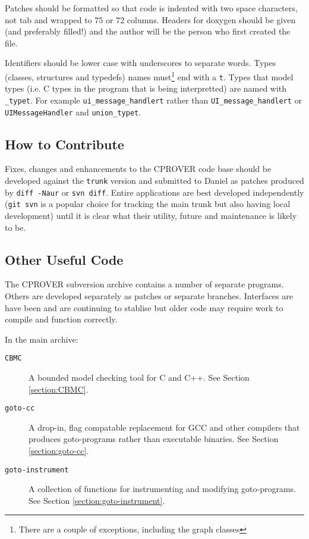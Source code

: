 \documentclass{article}
\newcommand{\code}[1]{\texttt{#1}}
\newcommand{\prog}[1]{\texttt{#1}}
\begin{document}
Patches should be formatted so that code is indented with two space
characters, not tab and wrapped to 75 or 72 columns.  Headers for
doxygen should be given (and preferably filled!) and the author will
be the person who first created the file.

Identifiers should be lower case with underscores to separate words.
Types (classes, structures and typedefs) names must\footnote{There are
a couple of exceptions, including the graph classes} end with a
\code{t}.  Types that model types (i.e. C types in the program that is
being interpretted) are named with \code{\_typet}.
For example \code{ui\_message\_handlert} rather than
\code{UI\_message\_handlert} or \code{UIMessageHandler} and
\code{union\_typet}.



\subsection{How to Contribute}

Fixes, changes and enhancements to the CPROVER code base should be
developed against the \texttt{trunk} version and submitted to Daniel
as patches produced by \texttt{diff -Naur} or \texttt{svn diff}.
Entire applications are best developed independently (\texttt{git svn}
is a popular choice for tracking the main trunk but also having local
development) until it is clear what their utility, future and
maintenance is likely to be.


\subsection{Other Useful Code}
\label{section:other-apps}

The CPROVER subversion archive contains a number of separate
programs.  Others are developed separately as patches or separate
branches.%
Interfaces are have been and are continuing to stablise but older code
may require work to compile and function correctly.

In the main archive:

\begin{description}
  \item[\prog{CBMC}]{A bounded model checking tool for C and C++. See
    Section \ref{section:CBMC}.}
  \item[\prog{goto-cc}]{A drop-in, flag compatable replacement for GCC
    and other compilers that produces goto-programs rather than
    executable binaries.  See Section \ref{section:goto-cc}.}
  \item[\prog{goto-instrument}]{A collection of functions for
    instrumenting and modifying goto-programs.  See Section
    \ref{section:goto-instrument}.}
\end{description}
\end{document}
